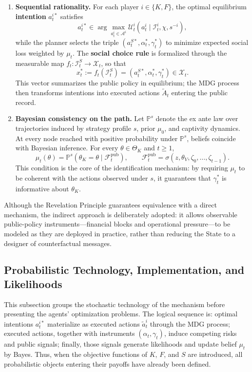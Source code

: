 \documentclass[12pt,a4paper]{article}
\theoremstyle{plain}
\theoremstyle{definition}
\theoremstyle{remark}
\newcommand{\ProbE}{\mathbb{P}}
\newcommand{\1}{\mathbf{1}}
\begin{document}
\begin{enumerate}
  \item \textbf{Sequential rationality.} For each player $i\in\{K,F\}$, the optimal
  equilibrium \textbf{intention} $a_t^{i\ast}$ satisfies
  \[
  a_t^{i\ast}\in\arg\max_{a_t^i\in\mathcal{A}^i}
  \mathcal{U}_t^i(a_t^i\mid\mathcal{I}_t^i,\chi,s^{-i}),
  \]
  while the planner selects the triple
  $(a_t^{S\ast},\alpha_t^\ast,\gamma_t^\ast)$ to minimize expected social loss
  weighted by $\mu_t$. The \textbf{social choice rule} is formalized through the
  measurable map $f_t:\mathcal{I}_t^S\to\mathcal{X}_t$, so that
  \[
  x_t^\ast:=f_t(\mathcal{I}_t^S)=
  (a_t^{S\ast},\alpha_t^\ast,\gamma_t^\ast)\in\mathcal{X}_t.
  \]
  This vector summarizes the public policy in equilibrium; the MDG process then
  transforms intentions into executed actions $\tilde{A}_t$ entering the public record.

  \item \textbf{Bayesian consistency on the path.} Let $\ProbE^s$ denote the ex ante
  law over trajectories induced by strategy profile $s$, prior $\mu_0$, and captivity
  dynamics. At every node reached with positive probability under $\ProbE^s$, beliefs
  coincide with Bayesian inference. For every $\theta\in\Theta_K$ and $t\ge1$,
  \[
  \mu_t(\theta)=\ProbE^s(\theta_K=\theta\mid\mathcal{F}_t^{\mathrm{pub}}),
  \qquad
  \mathcal{F}_t^{\mathrm{pub}}=\sigma(z,\theta_V,\zeta_0,\dots,\zeta_{t-1}).
  \]
  This condition is the core of the identification mechanism: by requiring $\mu_t$ to
  be coherent with the actions observed under $s$, it guarantees that
  $\gamma_t^\ast$ is informative about $\theta_K$.
\end{enumerate}

Although the Revelation Principle guarantees equivalence with a direct mechanism, the
indirect approach is deliberately adopted: it allows observable public-policy
instruments---financial blocks and operational pressure---to be modeled as they are
deployed in practice, rather than reducing the State to a designer of counterfactual
messages.

\subsection{Probabilistic Technology, Implementation, and Likelihoods}
\label{sec:probability-technology}

This subsection groups the stochastic technology of the mechanism before presenting
the agents' optimization problems. The logical sequence is: optimal intentions
$a_t^{i\ast}$ materialize as executed actions $\tilde a_t^i$ through the MDG process;
executed actions, together with instruments $(\alpha_t,\gamma_t)$, induce competing
risks and public signals; finally, those signals generate likelihoods and update belief
$\mu_t$ by Bayes. Thus, when the objective functions of $K$, $F$, and $S$ are
introduced, all probabilistic objects entering their payoffs have already been defined.
\end{document}
